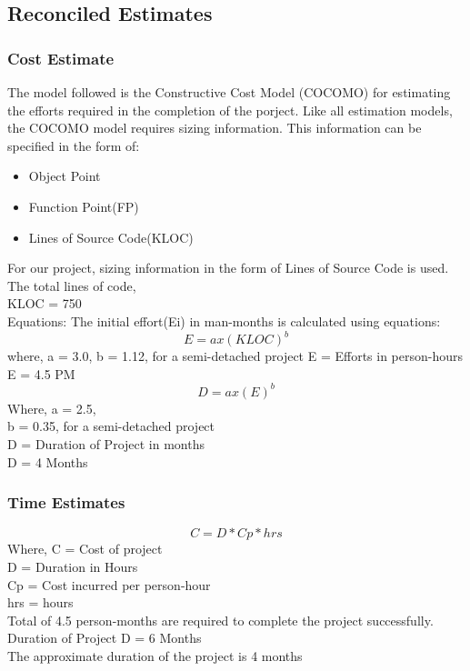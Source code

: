 \documentclass[oneside,a4paper,12pt]{report}
\begin{document}
\begin{table}[!htbp]
\subsection{Reconciled Estimates}
\subsubsection{Cost Estimate}
\hspace*{0.25 in}
The model followed is the Constructive Cost Model (COCOMO) for estimating the
efforts required in the completion of the porject. Like all estimation models, the
COCOMO model requires sizing information. This information can be specified in
the form of:
\begin{itemize}
  \item Object Point
  \item Function Point(FP)
  \item Lines of Source Code(KLOC)
\end{itemize}
For our project, sizing information in the form of Lines of Source Code is used. The
total lines of code,\\
KLOC = 750\\
Equations: The initial effort(Ei) in man-months is calculated using equations:\\

\[E=ax(KLOC)^b\]
\hspace*{0.25 in}where, a = 3.0, b = 1.12, for a semi-detached project
E = Efforts in person-hours\\
E = 4.5 PM\\
\[D=ax(E)^b\]
Where, a = 2.5,\\
b = 0.35, for a semi-detached project\\
D = Duration of Project in months\\
D = 4 Months\\

\subsubsection{Time Estimates}
\[C=D*Cp*hrs\]
Where, C = Cost of project\\
D = Duration in Hours\\
Cp = Cost incurred per person-hour\\
hrs = hours\\
Total of 4.5 person-months are required to complete the project successfully.\\
Duration of Project D = 6 Months\\
The approximate duration of the project is 4 months\\


\end{table}
\end{document}
